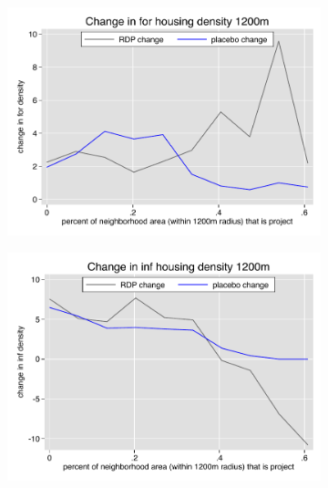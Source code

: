 \documentclass[12pt]{article}
\begin{document}
\begin{figure}
\begin{subfigure}[b]{0.495\textwidth}
        \end{subfigure}
        \vspace{-6mm}
        \begin{subfigure}[b]{0.495\textwidth}
            \centering
            \includegraphics[width=\textwidth,trim={0.3cm .3cm 0.1cm 0cm}, clip=true]{figures/change_for_1200_local.pdf}
        \end{subfigure}
        \hfill
        \begin{subfigure}[b]{0.495\textwidth}  
            \centering 
            \includegraphics[width=\textwidth,trim={0.3cm .3cm 0.1cm 0cm}, clip=true]{figures/change_inf_1200_local.pdf}
        \end{subfigure}
        \vspace{-6mm}
    \end{figure} 
\end{document}
